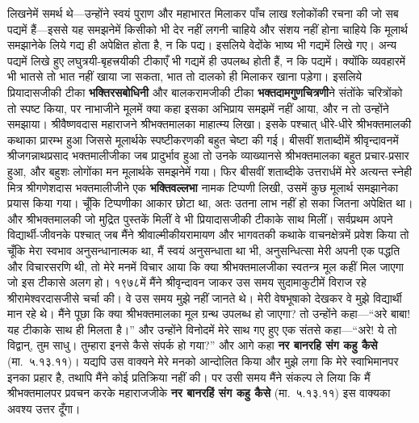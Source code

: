 \begin{sloppypar}
लिखनेमें समर्थ थे—उन्होंने स्वयं पुराण और महाभारत मिलाकर पाँच लाख श्लोकोंकी रचना की जो सब पद्यमें हैं—इससे यह समझनेमें किसीको भी देर नहीं लगनी चाहिये और संशय नहीं होना चाहिये कि मूलार्थ समझानेके लिये गद्य ही अपेक्षित होता है, न कि पद्य। इसलिये वेदोंके भाष्य भी गद्यमें लिखे गए। अन्य पद्यमें लिखे हुए लघुत्रयी-बृहत्त्रयीकी टीकाएँ भी गद्यमें ही उपलब्ध होती हैं, न कि पद्यमें। क्योंकि व्यवहारमें भी भातसे तो भात नहीं खाया जा सकता, भात तो दालको ही मिलाकर खाना पड़ेगा। इसलिये प्रियादासजीकी टीका \textbf{भक्तिरसबोधिनी} और बालकरामजीकी टीका \textbf{भक्तदामगुणचित्रणी}ने संतोंके चरित्रोंको तो स्पष्ट किया, पर नाभाजीने मूलमें क्या कहा इसका अभिप्राय समझमें नहीं आया, और न तो उन्होंने समझाया। श्रीवैष्णवदास महाराजने श्रीभक्तमालका माहात्म्य लिखा। इसके पश्चात् धीरे-धीरे श्रीभक्तमालकी कथाका प्रारम्भ हुआ जिससे मूलार्थके स्पष्टीकरणकी बहुत चेष्टा की गई। बीसवीं शताब्दीमें श्रीवृन्दावनमें श्रीजगन्नाथ\-प्रसाद भक्तमालीजीका जब प्रादुर्भाव हुआ तो उनके व्याख्यानसे श्रीभक्तमालका बहुत प्रचार-प्रसार हुआ, और बहुशः लोगोंका मन मूलार्थके समझनेमें गया। फिर बीसवीं शताब्दीके उत्तरार्धमें मेरे अत्यन्त स्नेही मित्र श्रीगणेशदास भक्तमालीजीने एक \textbf{भक्तिवल्लभा} नामक टिप्पणी लिखी, उसमें कुछ मूलार्थ समझानेका प्रयास किया गया। चूँकि टिप्पणीका आकार छोटा था, अतः उतना लाभ नहीं हो सका जितना अपेक्षित था। और श्रीभक्तमालकी जो मुद्रित पुस्तकें मिलीं वे भी प्रियादासजीकी टीकाके साथ मिलीं। 
सर्वप्रथम अपने विद्यार्थी-जीवनके पश्चात् जब मैंने श्रीवाल्मीकीय\-रामायण और भागवतकी कथाके वाचनक्षेत्रमें प्रवेश किया तो चूँकि मेरा स्वभाव अनुसन्धानात्मक था, मैं स्वयं अनुसन्धाता था भी, अनुसन्धित्सा मेरी अपनी एक पद्धति और विचारसरणि थी, तो मेरे मनमें विचार आया कि क्या श्रीभक्तमालजीका स्वतन्त्र मूल कहीं मिल जाएगा जो इस टीकासे अलग हो। १९७८में मैंने श्रीवृन्दावन जाकर उस समय सुदामा\-कुटीमें विराज रहे श्रीरामेश्वरदासजीसे चर्चा की। वे उस समय मुझे नहीं जानते थे। मेरी वेषभूषाको देखकर वे मुझे विद्यार्थी मान रहे थे। मैंने पूछा कि क्या श्रीभक्तमालका मूल ग्रन्थ उपलब्ध हो जाएगा? तो उन्होंने कहा—“अरे बाबा! यह टीकाके साथ ही मिलता है।” और उन्होंने विनोदमें मेरे साथ गए हुए एक संतसे कहा—“अरे! ये तो विद्वान्, तुम साधु। तुम्हारा इनसे कैसे संपर्क हो गया?” और आगे कहा \textbf{नर बानरहि संग कहु कैसे} (मा.~५.१३.११)। यद्यपि उस वाक्यने मेरे मनको आन्दोलित किया और मुझे लगा कि मेरे स्वाभिमानपर इनका प्रहार है, तथापि मैंने कोई प्रतिक्रिया नहीं की। पर उसी समय मैंने संकल्प ले लिया कि मैं श्रीभक्तमालपर प्रवचन करके महाराजजीके \textbf{नर बानरहिं संग कहु कैसे} (मा.~५.१३.११)  इस वाक्यका अवश्य उत्तर दूँगा।

\end{sloppypar}

